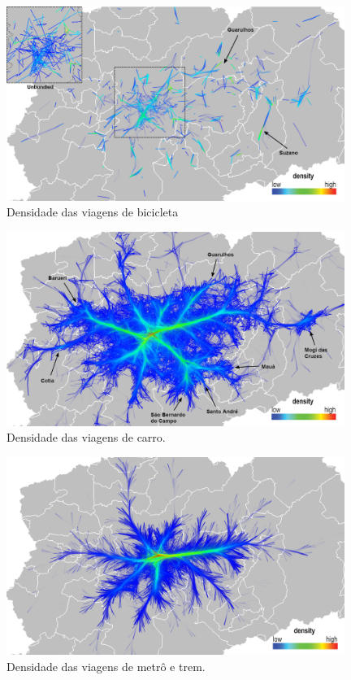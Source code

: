 \begin{figure}[!htb]
  \centering
  \captionsetup{justification=centering}
  \includegraphics[width=0.98\textwidth]{../figuras/mode-bike-density-leg.png}
  \caption{Densidade das viagens de bicicleta \label{fig:mode-bike}}
\end{figure}

\begin{figure}[!htb]
  \centering
  \captionsetup{justification=centering}
  \includegraphics[width=0.98\textwidth]{../figuras/mode-car-density-leg.png}
  \caption{Densidade das viagens de carro. \label{fig:mode-car}}
\end{figure}

\begin{figure}[!htb]
  \centering
  \captionsetup{justification=centering}
  \includegraphics[width=0.98\textwidth]{../figuras/mode-subway-density-leg.png}
  \caption{Densidade das viagens de metrô e trem. \label{fig:mode-subway}}
\end{figure}

